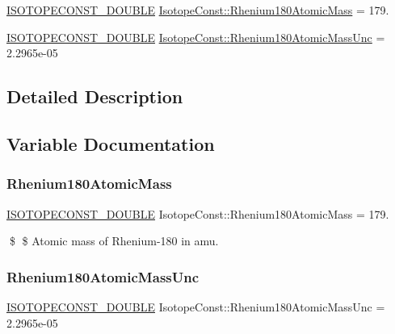 \begin{DoxyCompactItemize}
\item 
\mbox{\hyperlink{group___isotope_const-_macros_ga8f45a7272ce02c0b4c65c44636ed719a}{I\+S\+O\+T\+O\+P\+E\+C\+O\+N\+S\+T\+\_\+\+D\+O\+U\+B\+LE}} \mbox{\hyperlink{group___isotope_const-_rhenium-_re180_gac990c5737613c4af4028caea1dfac667}{Isotope\+Const\+::\+Rhenium180\+Atomic\+Mass}} = 179.
\item 
\mbox{\hyperlink{group___isotope_const-_macros_ga8f45a7272ce02c0b4c65c44636ed719a}{I\+S\+O\+T\+O\+P\+E\+C\+O\+N\+S\+T\+\_\+\+D\+O\+U\+B\+LE}} \mbox{\hyperlink{group___isotope_const-_rhenium-_re180_ga6b23dc01ceeac0f1a9fe3faf1814d8af}{Isotope\+Const\+::\+Rhenium180\+Atomic\+Mass\+Unc}} = 2.\+2965e-\/05
\end{DoxyCompactItemize}


\subsection{Detailed Description}


\subsection{Variable Documentation}
\mbox{\label{group___isotope_const-_rhenium-_re180_gac990c5737613c4af4028caea1dfac667}} 
\subsubsection{\texorpdfstring{Rhenium180\+Atomic\+Mass}{Rhenium180AtomicMass}}
{\footnotesize\ttfamily \mbox{\hyperlink{group___isotope_const-_macros_ga8f45a7272ce02c0b4c65c44636ed719a}{I\+S\+O\+T\+O\+P\+E\+C\+O\+N\+S\+T\+\_\+\+D\+O\+U\+B\+LE}} Isotope\+Const\+::\+Rhenium180\+Atomic\+Mass = 179.}

\$ \$ Atomic mass of Rhenium-\/180 in amu. \mbox{\label{group___isotope_const-_rhenium-_re180_ga6b23dc01ceeac0f1a9fe3faf1814d8af}} 
\subsubsection{\texorpdfstring{Rhenium180\+Atomic\+Mass\+Unc}{Rhenium180AtomicMassUnc}}
{\footnotesize\ttfamily \mbox{\hyperlink{group___isotope_const-_macros_ga8f45a7272ce02c0b4c65c44636ed719a}{I\+S\+O\+T\+O\+P\+E\+C\+O\+N\+S\+T\+\_\+\+D\+O\+U\+B\+LE}} Isotope\+Const\+::\+Rhenium180\+Atomic\+Mass\+Unc = 2.\+2965e-\/05}

